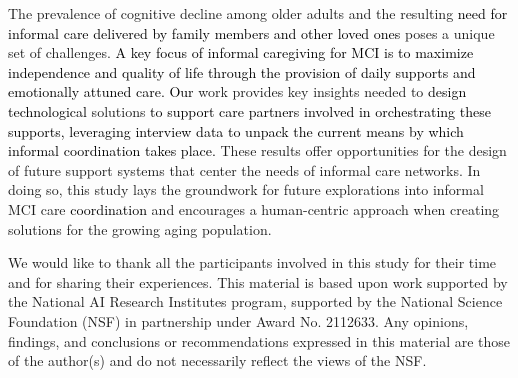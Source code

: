 \documentclass[acmsmall]{acmart}
\begin{document}
The prevalence of cognitive decline among older adults and the resulting \textcolor{black}{need for informal care delivered by family members and other loved ones} poses a unique set of challenges. \textcolor{black}{A key focus of informal caregiving for MCI is to maximize independence and quality of life through the provision of daily supports and emotionally attuned care. Our} work provides key insights needed to \textcolor{black}{design technological} solutions \textcolor{black}{to support care partners involved in orchestrating these supports, leveraging interview data to unpack the current means by which informal coordination takes place.} These results offer opportunities for the design of future support systems that center the needs of informal care networks. In doing so, this study lays the groundwork for future explorations into informal MCI care \textcolor{black}{coordination} and encourages a human-centric approach when creating solutions for the growing aging population.

\begin{acks}
    We would like to thank all the participants involved in this study for their time and for sharing their experiences. This material is based upon work supported by the National AI Research Institutes program, supported by the National Science Foundation (NSF) in partnership under Award No. 2112633. Any opinions, findings, and conclusions or recommendations expressed in this material are those of the author(s) and do not necessarily reflect the views of the NSF.  
\end{acks}





















































\end{document}
